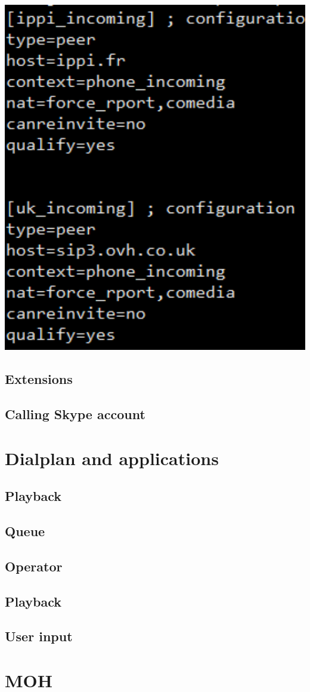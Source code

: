 \includegraphics[width=1\textwidth]{img/contextsphones.png}

\subsection{Extensions}


\subsection{Calling Skype account}


\section{Dialplan and applications}

\subsection{Playback}
\subsection{Queue}
\subsection{Operator}
\subsection{Playback}
\subsection{User input}



\section{MOH}
